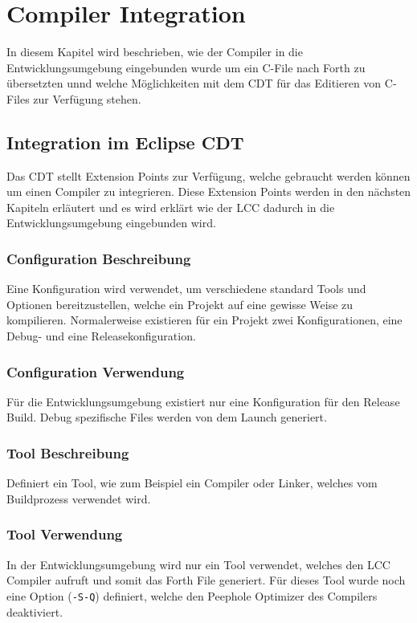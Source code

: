 \chapter{Compiler Integration}
\label{chap:compilerintegration}

In diesem Kapitel wird beschrieben, wie der Compiler in die Entwicklungsumgebung eingebunden wurde um ein C-File nach Forth zu übersetzten unnd welche Möglichkeiten mit dem CDT für das Editieren von C-Files zur Verfügung stehen.

\section{Integration im Eclipse CDT}

Das CDT stellt Extension Points zur Verfügung, welche gebraucht werden können um einen Compiler zu integrieren. Diese Extension Points werden in den nächsten Kapiteln erläutert und es wird erklärt wie der LCC dadurch in die Entwicklungsumgebung eingebunden wird.

\subsection{Configuration Beschreibung}
Eine Konfiguration wird verwendet, um verschiedene standard Tools und Optionen bereitzustellen, welche ein Projekt auf eine gewisse Weise zu kompilieren. Normalerweise existieren für ein Projekt zwei Konfigurationen, eine Debug- und eine Releasekonfiguration.

\subsection{Configuration Verwendung}
Für die Entwicklungsumgebung existiert nur eine Konfiguration für den Release Build. Debug spezifische Files werden von dem Launch generiert.

\subsection{Tool Beschreibung}
Definiert ein Tool, wie zum Beispiel ein Compiler oder Linker, welches vom Buildprozess verwendet wird.

\subsection{Tool Verwendung}
In der Entwicklungsumgebung wird nur ein Tool verwendet, welches den LCC Compiler aufruft und somit das Forth File generiert. Für dieses Tool wurde noch eine Option (\verb!-S-Q!) definiert, welche den Peephole Optimizer des Compilers deaktiviert.

